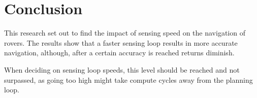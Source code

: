 \documentclass[a4paper,12pt,twocolumn]{report}
\begin{document}
\section{Conclusion}


This research set out to find the impact of sensing speed on the navigation of rovers. The results show that a faster sensing loop results in more accurate navigation, although, after a certain accuracy is reached returns diminish.

When deciding on sensing loop speeds, this level should be reached and not surpassed, as going too high might take compute cycles away from the planning loop.


\end{document}
